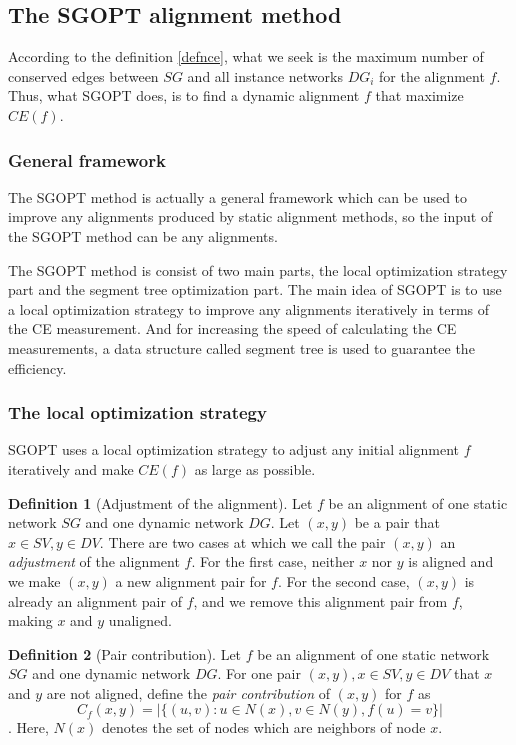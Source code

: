 \documentclass{bioinfo}
\theoremstyle{definition}
\newtheorem{defn}{\textbf{Definition}}[section]%
\begin{document}
\begin{methods}
\subsection{The SGOPT alignment method}
According to the definition \ref{defnce}, what we seek is the maximum number of conserved edges between $SG$ and all instance networks $DG_i$ for the alignment $f$. Thus, what SGOPT does, is to find a dynamic alignment $f$ that maximize $CE(f)$.
\subsubsection{General framework}
The SGOPT method is actually a general framework which can be used to improve any alignments produced by static alignment methods, so the input of the SGOPT method can be any alignments. 

The SGOPT method is consist of two main parts, the local optimization strategy part and the segment tree optimization part. The main idea of SGOPT is to use a local optimization strategy to improve any alignments iteratively in terms of the CE measurement. And for increasing the speed of calculating the CE measurements, a data structure called segment tree is used to guarantee the efficiency.

\subsubsection{The local optimization strategy}
SGOPT uses a local optimization strategy to adjust any initial alignment $f$ iteratively and make $CE(f)$ as large as possible.

\begin{defn}[Adjustment of the alignment]
\label{defnadj}
Let $f$ be an alignment of one static network $SG$ and one dynamic network $DG$. Let $(x,y)$ be a pair that $x\in SV,y\in DV$. There are two cases at which we call the pair $(x,y)$ an \textit{adjustment} of the alignment $f$. For the first case, neither $x$ nor $y$ is aligned and we make $(x,y)$ a new alignment pair for $f$. For the second case, $(x,y)$ is already an alignment pair of $f$, and we remove this alignment pair from $f$, making $x$ and $y$ unaligned.
\end{defn}

\begin{defn}[Pair contribution]
\label{defncontribute}
Let $f$ be an alignment of one static network $SG$ and one dynamic network $DG$. For one pair $(x,y),x\in SV,y\in DV$ that $x$ and $y$ are not aligned, define the \textit{pair contribution} of $(x,y)$ for $f$ as $$C_f(x,y)=|\{(u,v):u\in N(x),v\in N(y),f(u)=v\}|$$. Here, $N(x)$ denotes the set of nodes which are neighbors of node $x$.
\end{defn}


\end{methods}
\end{document}
